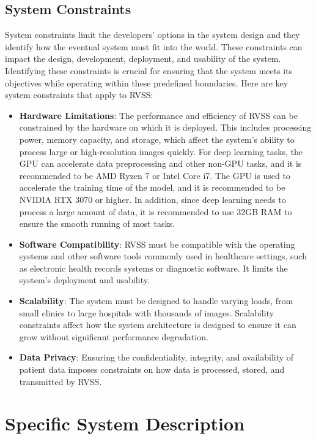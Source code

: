 \documentclass[12pt]{article}
\begin{document}
\subsection{System Constraints}

System constraints limit the developers’ options in the system design and they identify how the eventual system must fit into the
world. These constraints can impact the design, development, deployment, and usability of the system. Identifying these constraints is crucial for ensuring that the system meets its objectives while operating within these predefined boundaries. Here are key system constraints that apply to RVSS: 
\begin{itemize}
\item \textbf{Hardware Limitations}: The performance and efficiency of RVSS can be constrained by the hardware on which it is deployed. This includes processing power, memory capacity, and storage, which affect the system's ability to process large or high-resolution images quickly. For deep learning tasks, the GPU can accelerate data preprocessing and other non-GPU tasks, and it is recommended to be AMD Ryzen 7 or Intel Core i7. The GPU is used to accelerate the training time of the model, and it is recommended to be NVIDIA RTX 3070 or higher. In addition, since deep learning needs to process a large amount of data, it is recommended to use 32GB RAM to ensure the smooth running of most tasks.

\item  \textbf{Software Compatibility}: RVSS must be compatible with the operating systems and other software tools commonly used in healthcare settings, such as electronic health records systems or diagnostic software. It limits the system's deployment and usability.

\item \textbf{Scalability}: The system must be designed to handle varying loads, from small clinics to large hospitals with thousands of images. Scalability constraints affect how the system architecture is designed to ensure it can grow without significant performance degradation.

\item \textbf{Data Privacy}: Ensuring the confidentiality, integrity, and availability of patient data imposes constraints on how data is processed, stored, and transmitted by RVSS. 
\end{itemize}

\section{Specific System Description}
\end{document}
